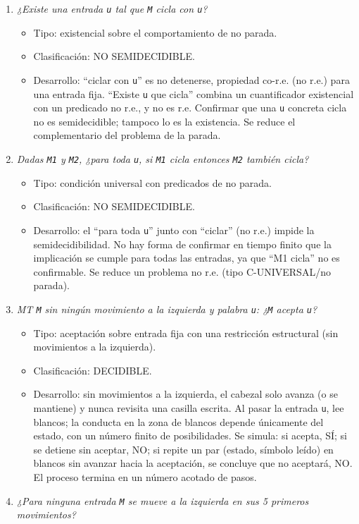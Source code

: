 \documentclass[12pt]{book} %
\providecommand{\tightlist}{%
  \setlength{\itemsep}{0pt}\setlength{\parskip}{0pt}}
\begin{document}
\begin{enumerate}
\def\labelenumi{\arabic{enumi}.}
\tightlist
\item
  \emph{¿Existe una entrada \texttt{u} tal que \texttt{M} cicla con
  \texttt{u}?}

  \begin{itemize}
  \tightlist
  \item
    Tipo: existencial sobre el comportamiento de no parada.
  \item
    Clasificación: NO SEMIDECIDIBLE.
  \item
    Desarrollo: ``ciclar con \texttt{u}'' es no detenerse, propiedad
    co-r.e. (no r.e.) para una entrada fija. ``Existe \texttt{u} que
    cicla'' combina un cuantificador existencial con un predicado no
    r.e., y no es r.e. Confirmar que una \texttt{u} concreta cicla no es
    semidecidible; tampoco lo es la existencia. Se reduce el
    complementario del problema de la parada.
  \end{itemize}
\item
  \emph{Dadas \texttt{M1} y \texttt{M2}, ¿para toda \texttt{u}, si
  \texttt{M1} cicla entonces \texttt{M2} también cicla?}

  \begin{itemize}
  \tightlist
  \item
    Tipo: condición universal con predicados de no parada.
  \item
    Clasificación: NO SEMIDECIDIBLE.
  \item
    Desarrollo: el ``para toda \texttt{u}'' junto con ``ciclar'' (no
    r.e.) impide la semidecidibilidad. No hay forma de confirmar en
    tiempo finito que la implicación se cumple para todas las entradas,
    ya que ``M1 cicla'' no es confirmable. Se reduce un problema no r.e.
    (tipo C-UNIVERSAL/no parada).
  \end{itemize}
\item
  \emph{MT \texttt{M} sin ningún movimiento a la izquierda y palabra
  \texttt{u}: ¿\texttt{M} acepta \texttt{u}?}

  \begin{itemize}
  \tightlist
  \item
    Tipo: aceptación sobre entrada fija con una restricción estructural
    (sin movimientos a la izquierda).
  \item
    Clasificación: DECIDIBLE.
  \item
    Desarrollo: sin movimientos a la izquierda, el cabezal solo avanza
    (o se mantiene) y nunca revisita una casilla escrita. Al pasar la
    entrada \texttt{u}, lee blancos; la conducta en la zona de blancos
    depende únicamente del estado, con un número finito de
    posibilidades. Se simula: si acepta, SÍ; si se detiene sin aceptar,
    NO; si repite un par (estado, símbolo leído) en blancos sin avanzar
    hacia la aceptación, se concluye que no aceptará, NO. El proceso
    termina en un número acotado de pasos.
  \end{itemize}
\item
  \emph{¿Para ninguna entrada \texttt{M} se mueve a la izquierda en sus
  5 primeros movimientos?}


\end{enumerate}
\end{document}
